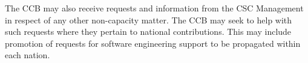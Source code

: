 \documentclass[../main-00.tex]{subfiles}
\begin{document}
The CCB may also receive requests and information from the CSC Management in respect of any other non-capacity matter. The CCB may seek to help with such requests where they pertain to national contributions. This may include promotion of requests for software engineering support to be propagated within each nation.
\end{document}
